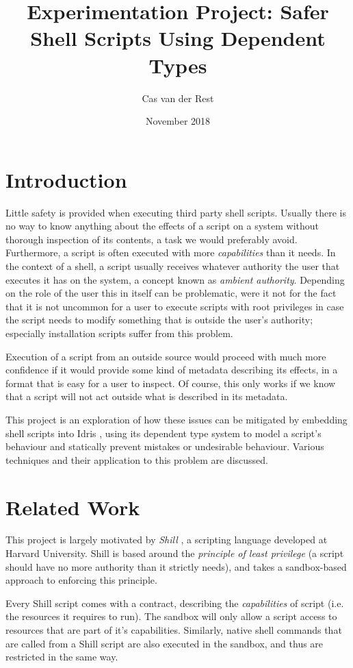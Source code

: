 \documentclass[12pt,a4paper]{article}
\title{Experimentation Project: Safer Shell Scripts Using Dependent Types}
\author{Cas van der Rest}
\date{November 2018}
\begin{document}
\maketitle

\section{Introduction}

Little safety is provided when executing third party shell scripts. Usually there is no way to know anything about the effects of a script on a system without thorough inspection of its contents, a task we would preferably avoid. Furthermore, a script is often executed with more \textit{capabilities} than it needs. In the context 
of a shell, a script usually receives whatever authority the user that executes it has on the system, a concept known as \textit{ambient authority}. Depending on the role of the user this in itself can be 
problematic, were it not for the fact that it is not uncommon for a user to execute scripts with root privileges in case the script needs to modify something that is outside the user's authority; especially installation scripts suffer from this problem. 

Execution of a script from an outside source would proceed with much more confidence if it would provide some kind of metadata describing its effects, in a format that is easy for a user to inspect. Of 
course, this only works if we know that a script will not act outside what is described in its metadata.

This project is an exploration of how these issues can be mitigated by embedding shell scripts into Idris \cite{brady13}, using its dependent type system to model a script's behaviour and statically prevent mistakes or undesirable behaviour. Various techniques and their application to this problem are discussed. 

\section{Related Work}

This project is largely motivated by \textit{Shill} \cite{moore14}, a scripting language developed at Harvard University. Shill is based around the \textit{principle of least privilege} \cite{saltzer74} (a script should have no more authority than it strictly needs), and takes a sandbox-based approach to enforcing this principle. 

Every Shill script comes with a contract, describing the \textit{capabilities} of script (i.e. the resources it requires to run). The sandbox will only allow a script access to resources that are part of it's capabilities. Similarly, native shell commands that are called from a Shill script are also executed in the sandbox, and thus are restricted in the same way. 
\end{document}

